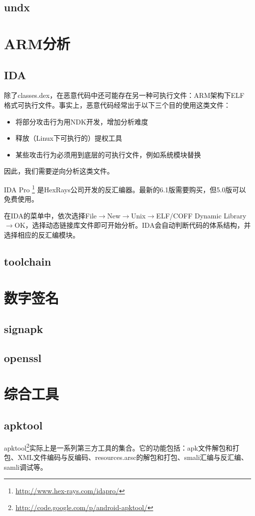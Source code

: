 \subsection{undx}

\section{ARM分析}
\subsection{IDA}
除了classes.dex，在恶意代码中还可能存在另一种可执行文件：ARM架构下ELF格式可执行文件。事实上，恶意代码经常出于以下三个目的使用这类文件：
\begin{itemize}
	\item 将部分攻击行为用NDK开发，增加分析难度
	\item 释放（Linux下可执行的）提权工具
	\item 某些攻击行为必须用到底层的可执行文件，例如系统模块替换
\end{itemize}
因此，我们需要逆向分析这类文件。

IDA Pro
\footnote{\url{http://www.hex-rays.com/idapro/}}
是Hex\-Rays公司开发的反汇编器。最新的6.1版需要购买，但5.0版可以免费使用。

在IDA的菜单中，依次选择File$\rightarrow$New$\rightarrow$Unix$\rightarrow$ELF/COFF Dynamic Library$\rightarrow$OK，选择动态链接库文件即可开始分析。IDA会自动判断代码的体系结构，并选择相应的反汇编模块。
\subsection{toolchain}

\section{数字签名}
\subsection{signapk}
\subsection{openssl}

\section{综合工具}
\subsection{apktool}
apktool\footnote{\url{http://code.google.com/p/android-apktool/}}实际上是一系列第三方工具的集合。它的功能包括：apk文件解包和打包、XML文件编码与反编码、resources.arsc的解包和打包、smali汇编与反汇编、samli调试等。

